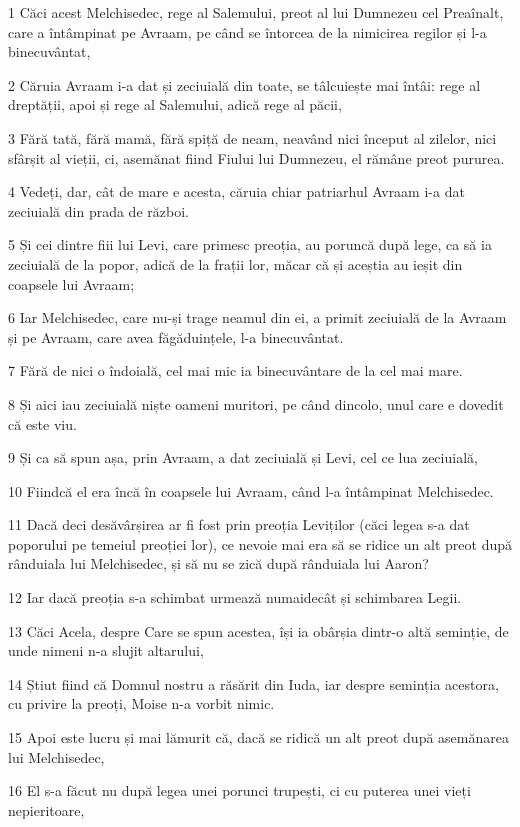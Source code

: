 \par 1 Căci acest Melchisedec, rege al Salemului, preot al lui Dumnezeu cel Preaînalt, care a întâmpinat pe Avraam, pe când se întorcea de la nimicirea regilor și l-a binecuvântat,
\par 2 Căruia Avraam i-a dat și zeciuială din toate, se tâlcuiește mai întâi: rege al dreptății, apoi și rege al Salemului, adică rege al păcii,
\par 3 Fără tată, fără mamă, fără spiță de neam, neavând nici început al zilelor, nici sfârșit al vieții, ci, asemănat fiind Fiului lui Dumnezeu, el rămâne preot pururea.
\par 4 Vedeți, dar, cât de mare e acesta, căruia chiar patriarhul Avraam i-a dat zeciuială din prada de război.
\par 5 Și cei dintre fiii lui Levi, care primesc preoția, au poruncă după lege, ca să ia zeciuială de la popor, adică de la frații lor, măcar că și aceștia au ieșit din coapsele lui Avraam;
\par 6 Iar Melchisedec, care nu-și trage neamul din ei, a primit zeciuială de la Avraam și pe Avraam, care avea făgăduințele, l-a binecuvântat.
\par 7 Fără de nici o îndoială, cel mai mic ia binecuvântare de la cel mai mare.
\par 8 Și aici iau zeciuială niște oameni muritori, pe când dincolo, unul care e dovedit că este viu.
\par 9 Și ca să spun așa, prin Avraam, a dat zeciuială și Levi, cel ce lua zeciuială,
\par 10 Fiindcă el era încă în coapsele lui Avraam, când l-a întâmpinat Melchisedec.
\par 11 Dacă deci desăvârșirea ar fi fost prin preoția Leviților (căci legea s-a dat poporului pe temeiul preoției lor), ce nevoie mai era să se ridice un alt preot după rânduiala lui Melchisedec, și să nu se zică după rânduiala lui Aaron?
\par 12 Iar dacă preoția s-a schimbat urmează numaidecât și schimbarea Legii.
\par 13 Căci Acela, despre Care se spun acestea, își ia obârșia dintr-o altă seminție, de unde nimeni n-a slujit altarului,
\par 14 Știut fiind că Domnul nostru a răsărit din Iuda, iar despre seminția acestora, cu privire la preoți, Moise n-a vorbit nimic.
\par 15 Apoi este lucru și mai lămurit că, dacă se ridică un alt preot după asemănarea lui Melchisedec,
\par 16 El s-a făcut nu după legea unei porunci trupești, ci cu puterea unei vieți nepieritoare,
